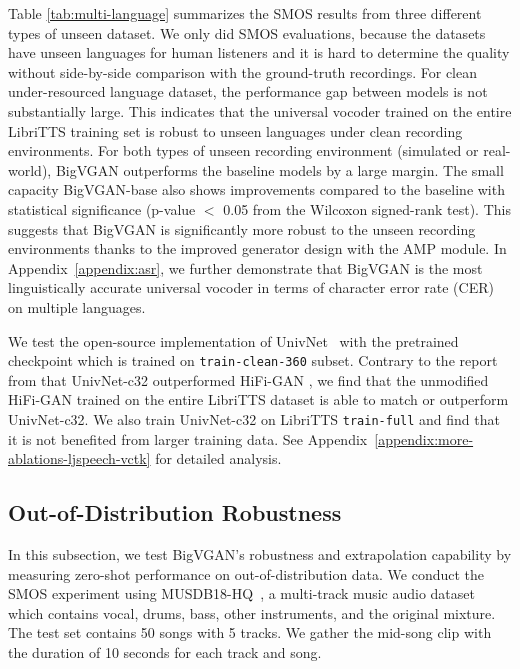 \documentclass{article} \usepackage{iclr2023_conference,times}
\theoremstyle{plain}
\theoremstyle{definition}
\theoremstyle{remark}
\begin{document}
Table \ref{tab:multi-language} summarizes the SMOS results from three different types of unseen dataset. We only did SMOS evaluations, because the datasets have unseen languages for human listeners and it is hard to determine the quality without side-by-side comparison with the ground-truth recordings. 
For clean under-resourced language dataset, the performance gap between models is not substantially large. This indicates that the universal vocoder trained on the entire LibriTTS training set is robust to unseen languages under clean recording environments.
For both types of unseen recording environment (simulated or real-world), BigVGAN outperforms the baseline models by a large margin. The small capacity BigVGAN-base also shows improvements compared to the baseline with statistical significance (p-value $<$ 0.05 from the Wilcoxon signed-rank test). This suggests that BigVGAN is significantly more robust to the unseen recording environments thanks to the improved generator design with the AMP module.
In Appendix~\ref{appendix:asr}, we further demonstrate that BigVGAN is the most linguistically accurate universal vocoder in terms of character error rate (CER) on multiple languages.


We test the open-source implementation of UnivNet~\citep{jang2021univnet} with the pretrained checkpoint which is trained on \texttt{train-clean-360} subset. 
Contrary to the report from \citet{jang2021univnet} that UnivNet-c32 outperformed HiFi-GAN \citep{kong2020hifi}, we find that the unmodified HiFi-GAN trained on the entire LibriTTS dataset is able to match or outperform UnivNet-c32. 
We also train UnivNet-c32 on LibriTTS \texttt{train-full} and find that it is not benefited from larger training data. See Appendix~\ref{appendix:more-ablations-ljspeech-vctk} for detailed analysis. 


\vspace{-.2cm}
\subsection{Out-of-Distribution Robustness}
\vspace{-.1cm}
In this subsection, we test BigVGAN's robustness and extrapolation capability by measuring zero-shot performance on out-of-distribution data. We conduct the SMOS experiment using MUSDB18-HQ~\citep{musdb18-hq}, a multi-track music audio dataset which contains vocal, drums, bass, other instruments, and the original mixture. The test set contains 50 songs with 5 tracks. We gather the mid-song clip with the duration of 10 seconds for each track and song.
\end{document}
